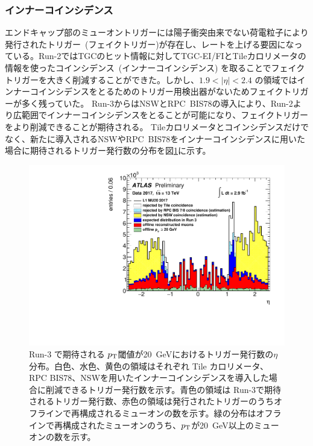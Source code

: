 \subsubsection{インナーコインシデンス}\label{innnercoin}
エンドキャップ部のミューオントリガーには陽子衝突由来でない荷電粒子により発行されたトリガー~(フェイクトリガー)が存在し、レートを上げる要因になっている。Run-2ではTGCのヒット情報に対してTGC-EI/FIとTileカロリメータの情報を使ったコインシデンス~(インナーコインシデンス) を取ることでフェイクトリガーを大きく削減することができた。しかし、$1.9 < |\eta| < 2.4$ の領域ではインナーコインシデンスをとるためのトリガー用検出器がないためフェイクトリガーが多く残っていた。
Run-3からはNSWとRPC~BIS78の導入により、Run-2より広範囲でインナーコインシデンスをとることが可能になり、フェイクトリガーをより削減できることが期待される。
Tileカロリメータとコインシデンスだけでなく、新たに導入されるNSWやRPC~BIS78をインナーコインシデンスに用いた場合に期待されるトリガー発行数の分布を図\ref{fig:Rate_innercoincidence}に示す。

\begin{figure}[tb]
  \centering
    \includegraphics[clip, width=14cm]{fig/3/ATL-COM-DAQ-2018-033-fig2.pdf}
  \caption{Run-3 で期待される $p_{\rm{T}}$閾値が20~GeVにおけるトリガー発行数の$\eta$分布\cite{article:ATLASpublic}。白色、水色、黄色の領域はそれぞれ Tile カロリメータ、RPC BIS78、NSWを用いたインナーコインシデンスを導入した場合に削減できるトリガー発行数を示す。青色の領域は Run-3で期待されるトリガー発行数、赤色の領域は発行されたトリガーのうちオフラインで再構成されるミューオンの数を示す。緑の分布はオフラインで再構成されたミューオンのうち、$p_{\rm{T}}$が20~GeV以上のミューオンの数を示す。}
  \label{fig:Rate_innercoincidence}
\end{figure}

